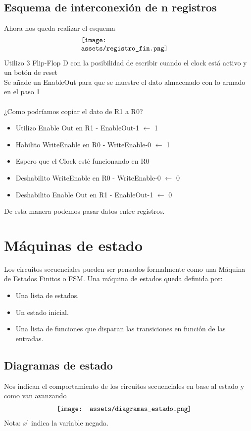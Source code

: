 \documentclass[10pt,a4paper]{article}
\begin{document}
\subsection*{Esquema de interconexión de n registros}
Ahora nos queda realizar el esquema 
\[\begin{minipage}[b]{0.4\textwidth}
    \texttt{[image: assets/registro\_fin.png]}
    \label{fig:registro_fin}
\end{minipage}\]
Utilizo 3 Flip-Flop D con la posibilidad de escribir cuando el clock está activo y un botón de reset \\
Se añade un EnableOut para que se muestre el dato almacenado con lo armado en el paso 1 \\ \\
¿Como podríamos copiar el dato de R1 a R0? 
\begin{itemize}
    \item Utilizo Enable Out en R1 - EnableOut-1 \(\leftarrow\) 1
    \item Habilito WriteEnable en R0 - WriteEnable-0 \(\leftarrow\) 1
    \item Espero que el Clock esté funcionando en R0
    \item Deshabilito WriteEnable en R0 - WriteEnable-0 \(\leftarrow\) 0
    \item Deshabilito Enable Out en R1 - EnableOut-1 \(\leftarrow\) 0
\end{itemize}
De esta manera podemos pasar datos entre registros.

\section{Máquinas de estado}
Los circuitos secuenciales pueden ser pensados formalmente como una Máquina de Estados Finitos o FSM.
Una máquina de estados queda definida por: 
\begin{itemize}
    \item Una lista de estados.
    \item Un estado inicial.
    \item Una lista de funciones que disparan las transiciones en función de las entradas. 
\end{itemize}
\subsection*{Diagramas de estado}
Nos indican el comportamiento de los circuitos secuenciales en base al estado y como van avanzando
\[\begin{minipage}[b]{0.6\textwidth}
    \texttt{[image: assets/diagramas\_estado.png]}
    \label{fig:diagramas_estado}
\end{minipage}\]
Nota: \(x^{'}\) indica la variable negada.
\end{document}
